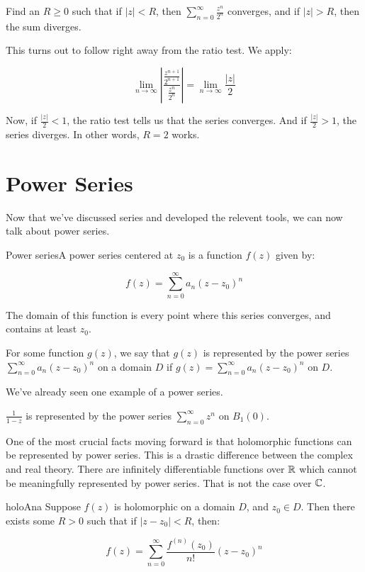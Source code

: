 \begin{ex}{}{} Find an $R\ge 0$ such that if $|z| < R$, then $\sum_{n = 0}^\infty \frac{z^n}{2^n}$ converges, and if $|z| > R$, then the sum diverges.

This turns out to follow right away from the ratio test. We apply:

$$\lim_{n\rightarrow \infty} \left| \frac{\frac{z^{n+1}}{2^{n+1}}}{\frac{z^n}{2^n}}\right| = \lim_{n\rightarrow \infty} \frac{|z|}{2}$$

Now, if $\frac{|z|}{2} < 1$, the ratio test tells us that the series converges. And if $\frac{|z|}{2}> 1$, the series diverges. In other words, $R = 2$ works.
\end{ex}

\section{Power Series}

Now that we've discussed series and developed the relevent tools, we can now talk about power series.

\begin{defbo}{Power series}{}A power series centered at $z_0$ is a function $f(z)$ given by:

$$f(z) = \sum_{n = 0}^\infty a_n(z-z_0)^n$$

The domain of this function is every point where this series converges, and contains at least $z_0$.

For some function $g(z)$, we say that $g(z)$ is represented by the power series $\sum_{n = 0}^\infty a_n(z-z_0)^n$ on a domain $D$ if $g(z) = \sum_{n = 0}^\infty a_n(z-z_0)^n$ on $D$.
\end{defbo}

We've already seen one example of a power series.

\begin{ex}{}{} $\frac{1}{1-z}$ is represented by the power series $\sum_{n = 0}^\infty z^n$ on $B_1(0)$.\end{ex}

One of the most crucial facts moving forward is that holomorphic functions can be represented by power series. This is a drastic difference between the complex and real theory. There are infinitely differentiable functions over $\mathbb{R}$ which cannot be meaningfully represented by power series. That is not the case over $\mathbb{C}$.

\begin{thmbo}{}{holoAna} Suppose $f(z)$ is holomorphic on a domain $D$, and $z_0 \in D$. Then there exists some $R > 0$ such that if $|z- z_0| < R$, then:

$$f(z) = \sum_{n = 0}^\infty \frac{f^{(n)}(z_0)}{n!}(z-z_0)^n$$
\end{thmbo}

